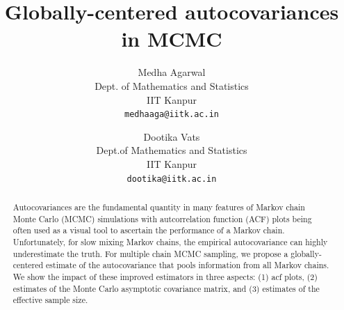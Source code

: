 \documentclass[11pt]{article}
\title{Globally-centered autocovariances in MCMC}
\author{
  Medha Agarwal \\
  Dept. of Mathematics and Statistics\\
  IIT Kanpur\\
  \texttt{medhaaga@iitk.ac.in} \and
 Dootika Vats \\
  Dept.of Mathematics and Statistics\\
  IIT Kanpur\\
  \texttt{dootika@iitk.ac.in}
}
\theoremstyle{remark}
\begin{document}
\maketitle


\onehalfspacing
\begin{abstract}
Autocovariances are the fundamental quantity in many features of Markov chain Monte Carlo (MCMC) simulations with autcorrelation function (ACF) plots being often used as a visual tool to ascertain the performance of a Markov chain. Unfortunately, for slow mixing Markov chains, the empirical autocovariance can highly underestimate the truth. For multiple chain MCMC sampling,  we propose a globally-centered estimate of the autocovariance that pools information from all Markov chains. We show the impact of these improved estimators in three aspects: (1) acf plots, (2) estimates of the Monte Carlo asymptotic covariance matrix, and (3) estimates of the effective sample size. 
\end{abstract}







\end{document}

